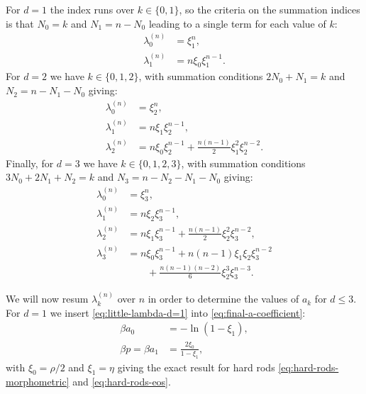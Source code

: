 \documentclass[11pt,twoside]{report}
\begin{document}
For $d=1$ the index runs over $k \in \{0,1\}$, so the criteria on the summation indices is that $N_0 = k$ and $N_1 = n - N_0$ leading to a single term for each value of $k$:
\begin{subequations}
  \label{eq:little-lambda-d=1}
  \begin{align}
    \lambda_0^{(n)} &= \xi_1^n,
    \\
    \lambda_1^{(n)} &= n \xi_0 \xi_1^{n-1}.
  \end{align}
\end{subequations}
For $d=2$ we have $k \in \{0,1,2\}$, with summation conditions $2N_0 + N_1 = k$ and $N_2 = n - N_1 - N_0$ giving:
\begin{subequations}
  \label{eq:little-lambda-d=2}
  \begin{align}
    \lambda_0^{(n)} &= \xi_2^n,
    \\
    \lambda_1^{(n)} &= n \xi_1 \xi_2^{n-1},
    \\
    \lambda_2^{(n)} &=
    n \xi_0 \xi_2^{n-1}
    + \frac{n(n-1)}{2} \xi_1^2 \xi_2^{n-2}.
  \end{align}
\end{subequations}
Finally, for $d=3$ we have $k \in \{0,1,2,3\}$, with summation conditions $3N_0 + 2N_1 + N_2 = k$ and $N_3 = n - N_2 - N_1 - N_0$ giving:
\begin{subequations}
  \label{eq:little-lambda-d=3}
  \begin{align}
    \lambda_0^{(n)} &= \xi_3^n,
    \\
    \lambda_1^{(n)} &= n \xi_2 \xi_3^{n-1},
    \\
    \lambda_2^{(n)} &=
    n \xi_1 \xi_3^{n-1}
    + \frac{n(n-1)}{2} \xi_2^2 \xi_3^{n-2},
    \\
    \lambda_3^{(n)} &=
    n \xi_0 \xi_3^{n-1}
    + n(n-1) \xi_1 \xi_2 \xi_3^{n-2}
    \nonumber \\ & \qquad
    + \frac{n(n-1)(n-2)}{6} \xi_2^3 \xi_3^{n-3}.
  \end{align}
\end{subequations}

We will now resum $\lambda_k^{(n)}$ over $n$ in order to determine the values of $a_k$ for $d \le 3$.
For $d=1$ we insert \eqref{eq:little-lambda-d=1} into \eqref{eq:final-a-coefficient}:
\begin{subequations}
  \begin{align}
    \beta a_0
    &= - \ln{(1 - \xi_1)},
    \\
    \beta p =
    \beta a_1 &=
    \frac{2 \xi_0}{1-\xi_1},
  \end{align}
\end{subequations}
with $\xi_0 = \rho / 2$ and $\xi_1 = \eta$ giving the exact result for hard rods \eqref{eq:hard-rods-morphometric} and \eqref{eq:hard-rods-eos}.
\end{document}
